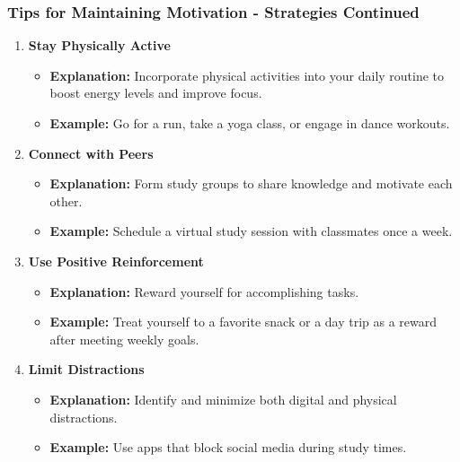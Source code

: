 \documentclass[aspectratio=169]{beamer}
\begin{document}
\begin{frame}[fragile]
    \frametitle{Tips for Maintaining Motivation - Strategies Continued}
    \begin{enumerate}[resume]
        \item \textbf{Stay Physically Active}
        \begin{itemize}
            \item \textbf{Explanation:} Incorporate physical activities into your daily routine to boost energy levels and improve focus.
            \item \textbf{Example:} Go for a run, take a yoga class, or engage in dance workouts.
        \end{itemize}

        \item \textbf{Connect with Peers}
        \begin{itemize}
            \item \textbf{Explanation:} Form study groups to share knowledge and motivate each other.
            \item \textbf{Example:} Schedule a virtual study session with classmates once a week.
        \end{itemize}

        \item \textbf{Use Positive Reinforcement}
        \begin{itemize}
            \item \textbf{Explanation:} Reward yourself for accomplishing tasks.
            \item \textbf{Example:} Treat yourself to a favorite snack or a day trip as a reward after meeting weekly goals.
        \end{itemize}

        \item \textbf{Limit Distractions}
        \begin{itemize}
            \item \textbf{Explanation:} Identify and minimize both digital and physical distractions.
            \item \textbf{Example:} Use apps that block social media during study times.
        \end{itemize}
    \end{enumerate}
\end{frame}
\end{document}
